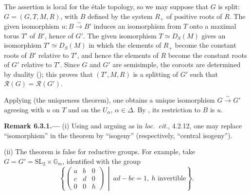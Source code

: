 The assertion is local for the étale topology, so we may suppose that
\(G\) is split: \(G=(G,T,M,R)\), with \(B\) defined by the system
\(R_+\) of positive roots of \(R\).  The given isomorphism
\(u:B\xrightarrow{\sim}B'\) induces an isomorphism from \(T\) onto a
maximal torus \(T'\) of \(B'\), hence of \(G'\).  The given
isomorphism \(T\simeq D_S(M)\) gives an isomorphism
\(T'\simeq D_S(M)\) in which the elements of \(R_+\) become the
constant roots of \(B'\) relative to \(T'\), and hence the elements of
\(R\) become the constant roots of \(G'\) relative to \(T'\).  Since
\(G\) and \(G'\) are semisimple, the coroots are determined by duality
(); this proves that \((T',M,R)\) is a splitting of
\(G'\) such that \(\mathscr R(G)=\mathscr R(G')\).

Applying  (the uniqueness theorem), one obtains a unique
isomorphism \(G\xrightarrow{\sim}G'\) agreeing with \(u\) on \(T\)
and on the \(U_\alpha\), \(\alpha\in\Delta\).  By , its restriction
to \(B\) is \(u\).

\par\medskip\noindent{}\textbf{Remark 6.3.1.---}\enspace
(i) Using  and arguing as in \emph{loc.\ cit.}, 4.2.12,
one may replace ``isomorphism'' in the theorem by ``isogeny''
(respectively, ``central isogeny'').

(ii) The theorem is false for reductive groups.  For example, take
\(G=G'=\mathrm{SL}_2\times\mathbb G_m\), identified with the group
\[
 \left\{
 \begin{pmatrix}
   a&b&0\\
   c&d&0\\
   0&0&h
 \end{pmatrix}
 \ \middle|\ ad-bc=1,\ h\text{ invertible}
 \right\}.
\]
